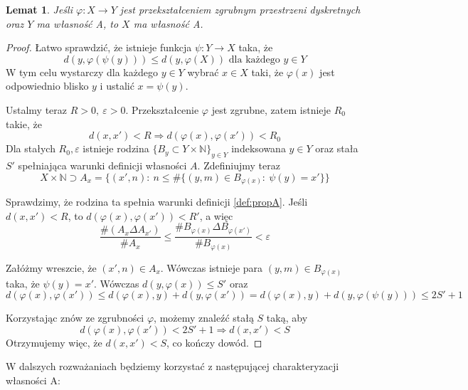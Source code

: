 \documentclass[licencjacka]{pracamgr}
\theoremstyle{definition}
\theoremstyle{definition}
\theoremstyle{definition}
\theoremstyle{definition}
\theoremstyle{definition}
\theoremstyle{plain}
\newtheorem{lemma}{Lemat}[section]
\theoremstyle{plain}
\begin{document}
\begin{lemma}
	Jeśli $ \varphi: X \rightarrow Y $ jest przekształceniem zgrubnym przestrzeni dyskretnych 
	oraz $ Y $ ma własność A, to $ X $ ma własność A.
\end{lemma}
\begin{proof}
	Łatwo sprawdzić, że istnieje funkcja $\psi: Y \rightarrow X $ taka, że
	$$ d(y, \varphi(\psi(y)))  \leq d(y,  \varphi(X)) \text{ dla każdego } y \in Y$$
	W tym celu wystarczy dla każdego $ y \in Y $ wybrać $ x \in X $ taki, że 
	$ \varphi(x) $ jest odpowiednio blisko $ y $ i ustalić $ x = \psi(y) $.

	Ustalmy teraz $ R > 0,~  \varepsilon > 0 $. Przekształcenie $\varphi$ jest zgrubne, zatem 
	istnieje $ R_0 $ takie, że $$ d(x,x') < R \Rightarrow d(\varphi(x), \varphi(x')) < R_0 $$ 
	Dla stałych $ R_0, \varepsilon $ istnieje rodzina 
	$ \{B_y \subset Y \times \mathbb{N}\}_{y \in Y} $ 
	indeksowana $ y \in Y $ oraz stała $S'$ spełniająca warunki definicji własności $ A $.
 	 Zdefiniujmy 
	teraz 
	$$ X \times \mathbb{N} \supset A_x = \{(x', n): ~ n \leq \# \{ (y,m) \in B_{\varphi(x)} : ~
	\psi(y) = x' \}\} $$

	Sprawdzimy, że rodzina ta spełnia warunki definicji \ref{def:propA}. Jeśli 
	$ d(x,x') < R $, to $ d(\varphi(x), \varphi(x')) < R' $, a więc 
	$$ \frac{\# (A_x \Delta A_{x'})}{\# A_x} \leq \frac{\# B_{\varphi(x)} \Delta 
	B_{\varphi(x')}}{\# B_{\varphi(x)}} < \varepsilon $$

	Załóżmy wreszcie, że $ (x', n) \in A_x $. Wówczas istnieje para $ (y,m) \in 
	B_{\varphi(x)} $ taka, że $ \psi(y) = x' $. Wówczas $d(y,\varphi(x)) \leq S'$ oraz 
	$$ d(\varphi(x), \varphi(x')) \leq d(\varphi(x),y) + d(y,\varphi(x')) = d(\varphi(x),y) + 
	d(y, \varphi(\psi(y))) \leq 2S' + 1 $$

	Korzystając znów ze zgrubności $\varphi$, możemy znaleźć stałą $ S $ taką, aby 
	$$ d(\varphi(x), \varphi(x')) < 2S' +1 \Rightarrow d(x,x') < S $$
	Otrzymujemy więc, że $ d(x,x') < S $, co kończy dowód.
\end{proof}

W dalszych rozważaniach będziemy korzystać z następującej charakteryzacji własności A:
\end{document}

